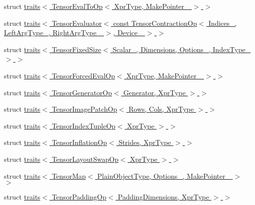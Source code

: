 \begin{DoxyCompactItemize}
\item 
struct \hyperlink{struct_eigen_1_1internal_1_1traits_3_01_tensor_eval_to_op_3_01_xpr_type_00_01_make_pointer___01_4_01_4}{traits$<$ Tensor\+Eval\+To\+Op$<$ Xpr\+Type, Make\+Pointer\+\_\+ $>$ $>$}
\item 
struct \hyperlink{struct_eigen_1_1internal_1_1traits_3_01_tensor_evaluator_3_01const_01_tensor_contraction_op_3_01d675ebf024b6201c69018a9924deb8c5}{traits$<$ Tensor\+Evaluator$<$ const Tensor\+Contraction\+Op$<$ Indices\+\_\+, Left\+Arg\+Type\+\_\+, Right\+Arg\+Type\+\_\+ $>$, Device\+\_\+ $>$ $>$}
\item 
struct \hyperlink{struct_eigen_1_1internal_1_1traits_3_01_tensor_fixed_size_3_01_scalar___00_01_dimensions_00_01_ocde4e51f48a16cc8d4f5161774f58603}{traits$<$ Tensor\+Fixed\+Size$<$ Scalar\+\_\+, Dimensions, Options\+\_\+, Index\+Type\+\_\+ $>$ $>$}
\item 
struct \hyperlink{struct_eigen_1_1internal_1_1traits_3_01_tensor_forced_eval_op_3_01_xpr_type_00_01_make_pointer___01_4_01_4}{traits$<$ Tensor\+Forced\+Eval\+Op$<$ Xpr\+Type, Make\+Pointer\+\_\+ $>$ $>$}
\item 
struct \hyperlink{struct_eigen_1_1internal_1_1traits_3_01_tensor_generator_op_3_01_generator_00_01_xpr_type_01_4_01_4}{traits$<$ Tensor\+Generator\+Op$<$ Generator, Xpr\+Type $>$ $>$}
\item 
struct \hyperlink{struct_eigen_1_1internal_1_1traits_3_01_tensor_image_patch_op_3_01_rows_00_01_cols_00_01_xpr_type_01_4_01_4}{traits$<$ Tensor\+Image\+Patch\+Op$<$ Rows, Cols, Xpr\+Type $>$ $>$}
\item 
struct \hyperlink{struct_eigen_1_1internal_1_1traits_3_01_tensor_index_tuple_op_3_01_xpr_type_01_4_01_4}{traits$<$ Tensor\+Index\+Tuple\+Op$<$ Xpr\+Type $>$ $>$}
\item 
struct \hyperlink{struct_eigen_1_1internal_1_1traits_3_01_tensor_inflation_op_3_01_strides_00_01_xpr_type_01_4_01_4}{traits$<$ Tensor\+Inflation\+Op$<$ Strides, Xpr\+Type $>$ $>$}
\item 
struct \hyperlink{struct_eigen_1_1internal_1_1traits_3_01_tensor_layout_swap_op_3_01_xpr_type_01_4_01_4}{traits$<$ Tensor\+Layout\+Swap\+Op$<$ Xpr\+Type $>$ $>$}
\item 
struct \hyperlink{struct_eigen_1_1internal_1_1traits_3_01_tensor_map_3_01_plain_object_type_00_01_options___00_01_make_pointer___01_4_01_4}{traits$<$ Tensor\+Map$<$ Plain\+Object\+Type, Options\+\_\+, Make\+Pointer\+\_\+ $>$ $>$}
\item 
struct \hyperlink{struct_eigen_1_1internal_1_1traits_3_01_tensor_padding_op_3_01_padding_dimensions_00_01_xpr_type_01_4_01_4}{traits$<$ Tensor\+Padding\+Op$<$ Padding\+Dimensions, Xpr\+Type $>$ $>$}

\end{DoxyCompactItemize}
